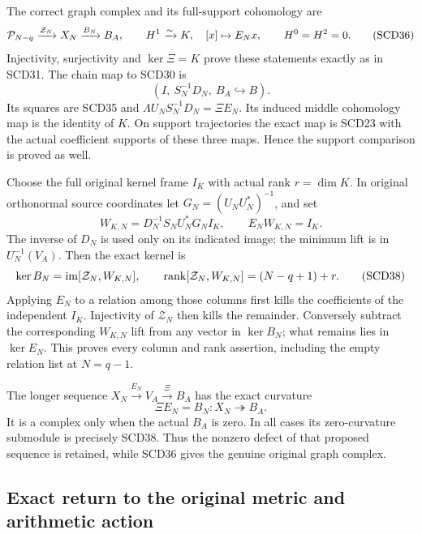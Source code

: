 The correct graph complex and its full-support cohomology are
\[
 \mathcal P_{N-q}\xrightarrow{\mathcal Z_N}X_N\xrightarrow{B_N}B_A,
 \qquad H^1\xrightarrow{\sim}K,\quad[x]\mapsto E_Nx,
 \qquad H^0=H^2=0 .
 \tag{SCD36}
\]
Injectivity, surjectivity and \(\ker\Xi=K\) prove these statements
exactly as in SCD31. The chain map to SCD30 is
\[
 (I,\ S_N^{-1}D_N,\ B_A\hookrightarrow B).
 \tag{SCD37}
\]
Its squares are SCD35 and
\(\Lambda U_NS_N^{-1}D_N=\Xi E_N\). Its induced middle
cohomology map is the identity of \(K\). On support trajectories
the exact map is SCD23 with the actual coefficient supports of
these three maps. Hence the support comparison is proved as well.

Choose the full original kernel frame \(I_K\) with actual rank
\(r=\dim K\). In original orthonormal source coordinates let
\(G_N=(U_NU_N^*)^{-1}\), and set
\[
 W_{K,N}=D_N^{-1}S_NU_N^*G_NI_K,\qquad
 E_NW_{K,N}=I_K .
\]
The inverse of \(D_N\) is used only on its indicated image;
the minimum lift is in \(U_N^{-1}(V_A)\). Then the exact kernel is
\[
 \ker B_N=\operatorname{im}[\mathcal Z_N,W_{K,N}],\qquad
 \operatorname{rank}[\mathcal Z_N,W_{K,N}]=(N-q+1)+r .
 \tag{SCD38}
\]
Applying \(E_N\) to a relation among those columns first kills
the coefficients of the independent \(I_K\). Injectivity of
\(\mathcal Z_N\) then kills the remainder. Conversely subtract
the corresponding \(W_{K,N}\) lift from any vector in \(\ker B_N\);
what remains lies in \(\ker E_N\). This proves every column and
rank assertion, including the empty relation list at \(N=q-1\).

The longer sequence \(X_N\xrightarrow{E_N}V_A\xrightarrow{\Xi}B_A\)
has the exact curvature
\[
 \Xi E_N=B_N:X_N\twoheadrightarrow B_A .
 \tag{SCD39}
\]
It is a complex only when the actual \(B_A\) is zero. In all cases
its zero-curvature submodule is precisely SCD38. Thus the nonzero
defect of that proposed sequence is retained, while SCD36 gives
the genuine original graph complex.

\subsection{Exact return to the original metric and arithmetic action}

